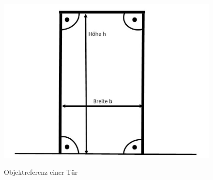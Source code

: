 \begin{figure}[ht]
	\centering
	\includegraphics[scale=0.55]{Bilder/door.jpg}
	\label{fig:door}
	\caption{Objektreferenz einer Tür}
\end{figure}


